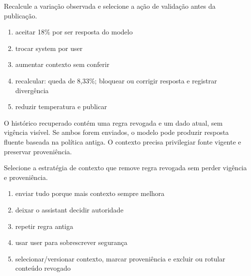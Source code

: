 \FonteDidatica

\Comando Recalcule a variação observada e selecione a ação de validação antes da publicação.

\begin{enumerate}[label=\Alph*)]

\item aceitar 18\% por ser resposta do modelo

\item trocar system por user

\item aumentar contexto sem conferir

\item recalcular: queda de 8,33\%; bloquear ou corrigir resposta e registrar divergência

\item reduzir temperatura e publicar

\end{enumerate}


\TextoBase

O histórico recuperado contém uma regra revogada e um dado atual, sem vigência visível. Se ambos forem enviados, o modelo pode produzir resposta fluente baseada na política antiga. O contexto precisa privilegiar fonte vigente e preservar proveniência.

\FonteDidatica

\Comando Selecione a estratégia de contexto que remove regra revogada sem perder vigência e proveniência.

\begin{enumerate}[label=\Alph*)]

\item enviar tudo porque mais contexto sempre melhora

\item deixar o assistant decidir autoridade

\item repetir regra antiga

\item usar user para sobrescrever segurança

\item selecionar/versionar contexto, marcar proveniência e excluir ou rotular conteúdo revogado

\end{enumerate}


